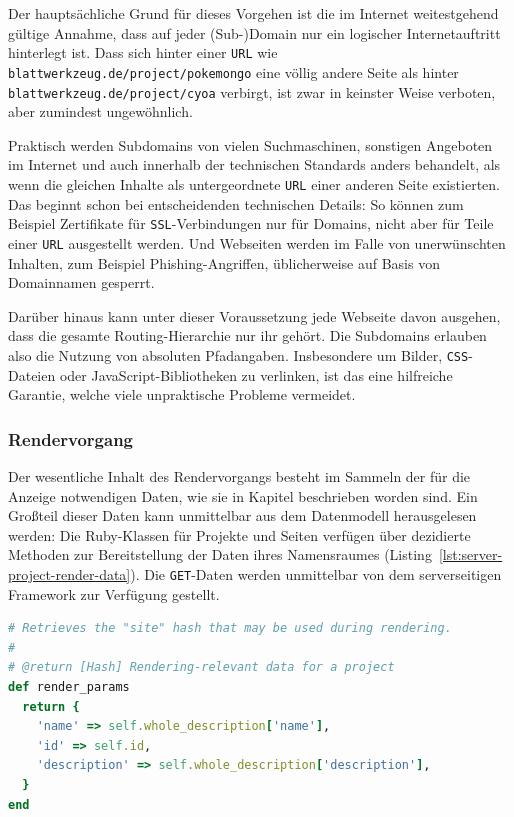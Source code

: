 Der hauptsächliche Grund für dieses Vorgehen ist die im Internet weitestgehend gültige Annahme, dass auf jeder (Sub-)Domain nur ein logischer Internetauftritt hinterlegt ist. Dass sich hinter einer \texttt{URL} wie \texttt{blatt\-werk\-zeug.de\-/project\-/pokemongo} eine völlig andere Seite als hinter \texttt{blatt\-werk\-zeug.de\-/project\-/cyoa} verbirgt, ist zwar in keinster Weise verboten, aber zumindest ungewöhnlich.

Praktisch werden Subdomains von vielen Suchmaschinen, sonstigen Angeboten im Internet und auch innerhalb der technischen Standards anders behandelt, als wenn die gleichen Inhalte als untergeordnete \texttt{URL} einer anderen Seite existierten. Das beginnt schon bei entscheidenden technischen Details: So können zum Beispiel Zertifikate für \texttt{SSL}-Verbindungen nur für Domains, nicht aber für Teile einer \texttt{URL} ausgestellt werden. Und Webseiten werden im Falle von unerwünschten Inhalten, zum Beispiel Phishing-Angriffen, üblicherweise auf Basis von Domainnamen gesperrt.

Darüber hinaus kann unter dieser Voraussetzung jede Webseite davon ausgehen, dass die gesamte Routing-Hierarchie nur ihr gehört. Die Subdomains erlauben also die Nutzung von absoluten Pfadangaben. Insbesondere um Bilder, \texttt{CSS}-Dateien oder JavaScript-Bibliotheken zu verlinken, ist das eine hilfreiche Garantie, welche viele unpraktische Probleme vermeidet.

\subsubsection{Rendervorgang}

Der wesentliche Inhalt des Rendervorgangs besteht im Sammeln der für die Anzeige notwendigen Daten, wie sie in Kapitel  beschrieben worden sind. Ein Großteil dieser Daten kann unmittelbar aus dem Datenmodell heraus\-gelesen werden: Die Ruby-Klassen für Projekte und Seiten verfügen über dezidierte Methoden zur Bereitstellung der Daten ihres Namensraumes (Listing~\ref{lst:server-project-render-data}). Die \texttt{GET}-Daten werden unmittelbar von dem serverseitigen Framework zur Verfügung gestellt.

\begin{lstlisting}[float=h, language=Ruby, caption={Bereitstellung der Renderdaten in der Projektklasse}, label={lst:server-project-render-data}]
# Retrieves the "site" hash that may be used during rendering.
#
# @return [Hash] Rendering-relevant data for a project
def render_params
  return {
    'name' => self.whole_description['name'],
    'id' => self.id,
    'description' => self.whole_description['description'],
  }
end
\end{lstlisting}

